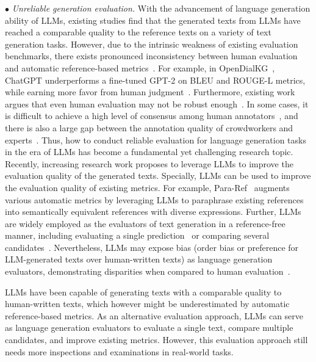 $\bullet$ \emph{Unreliable generation evaluation.}
\label{sec:generation-eval}
With the advancement of  language generation ability of LLMs, existing studies find that 
the generated texts from LLMs have reached a comparable quality to the reference texts on a variety of text  generation tasks. However, due to the intrinsic weakness of existing evaluation benchmarks, there exists pronounced inconsistency between human evaluation and automatic reference-based metrics~\cite{Zhang-2023-arxiv-Benchmarking,Goyal-2023-arxiv-News,Gehrmann-2022-arxiv-Repairing,Bang-arxiv-2023-A}. For example, 
in OpenDialKG~\cite{Moon-ACL-2019-OpenDialKG}, ChatGPT underperforms a fine-tuned GPT-2 on BLEU and ROUGE-L metrics, while earning more favor from human judgment~\cite{Bang-arxiv-2023-A}. Furthermore, existing work argues that even human evaluation may  not be robust enough~\cite{Goyal-2023-arxiv-News,Zhang-2023-arxiv-Benchmarking,Liu-arxiv-2022-Revisiting,Fabri-2021-tacl-SummEval}.
In some cases, it is difficult to achieve a high level of consensus among human annotators~\cite{Goyal-2023-arxiv-News}, and there is also a large gap between the annotation quality of crowdworkers and experts~\cite{Fabri-2021-tacl-SummEval,Liu-arxiv-2022-Revisiting}.
Thus, how to conduct reliable evaluation for language generation tasks in the era of LLMs has become a fundamental yet challenging research topic. 
Recently, increasing research work proposes to leverage LLMs to improve the evaluation quality of the generated texts.  
Specially, LLMs can be   used to improve the evaluation quality of existing metrics.
For example, Para-Ref~\cite{Tang-2023-arxiv-Not} augments various automatic metrics by leveraging LLMs to paraphrase existing references into semantically equivalent references with diverse expressions. 
Further, LLMs are widely employed as the evaluators of text generation in a reference-free manner, including evaluating a single prediction~\cite{Wang-2023-arxiv-Is,Liu-2023-arxiv-G-Eval,Wang-2023-arxiv-rethinking} or comparing several candidates~\cite{Gao-arxiv-2023-Human,Ji-2023-arxiv-Exploring,vicuna2023,Bai-2023-arxiv-Benchmarking}. 
Nevertheless, LLMs may expose bias (\eg order bias or preference for LLM-generated texts over human-written texts) as language generation evaluators, demonstrating disparities when compared to human evaluation~\cite{Liu-2023-arxiv-Evaluate,Liu-2023-arxiv-G-Eval,Wang-2023-arxiv-Large}. 

\begin{center}
\begin{tcolorbox}[colback=blue!5!white,colframe=blue!55!black,width=0.46\textwidth,title={Unreliable Generation Evaluation}]
LLMs have been capable of generating texts with a comparable quality to human-written texts, which however might be underestimated by automatic reference-based metrics. %
As an alternative evaluation approach, 
LLMs can serve as language generation evaluators to evaluate a single text, compare multiple candidates, and improve existing metrics. However, this evaluation approach still needs more inspections and examinations in real-world tasks.  
\end{tcolorbox}
\end{center}



